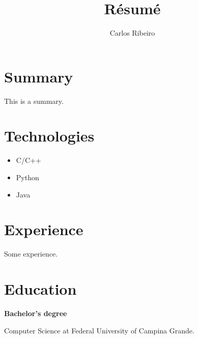\documentclass{article}
\author{Carlos Ribeiro}
\title{Résumé}
\begin{document}
\maketitle

\section{Summary}

This is a summary.

\section{Technologies}

\begin{itemize}
    \item C/C++
    \item Python
    \item Java
\end{itemize}

\section{Experience}

Some experience.

\section{Education}

\textbf{Bachelor's degree}

Computer Science at Federal University of Campina Grande.
\end{document}
